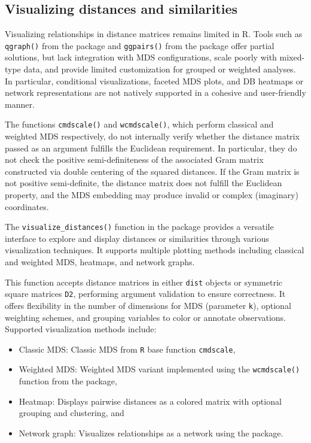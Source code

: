 \subsection{Visualizing distances and similarities}

Visualizing relationships in distance matrices remains limited in R. Tools such as \texttt{qgraph()} from the  package \citep{qgraph} and \texttt{ggpairs()} from the  package \citep{GGally} offer partial solutions, but lack integration with MDS configurations, scale poorly with mixed-type data, and provide limited customization for grouped or weighted analyses. In particular, conditional visualizations, faceted MDS plots, and DB heatmaps or network representations are not natively supported in a cohesive and user-friendly manner.

The functions \texttt{cmdscale()} and \texttt{wcmdscale()}, which perform classical and weighted MDS respectively, do not internally verify whether the distance matrix passed as an argument fulfills the Euclidean requirement. In particular, they do not check the positive semi-definiteness of the associated Gram matrix constructed via double centering of the squared distances. If the Gram matrix is not positive semi-definite, the distance matrix does not fulfill the Euclidean property, and the MDS embedding may produce invalid or complex (imaginary) coordinates.

The \texttt{visualize\_distances()} function in the  package provides a versatile interface to explore and display distances or similarities through various visualization techniques. It supports multiple plotting methods including classical and weighted MDS, heatmaps, and network graphs.

This function accepts distance matrices in either \texttt{dist} objects or symmetric square matrices \texttt{D2}, performing argument validation to ensure correctness. It offers flexibility in the number of dimensions for MDS (parameter \texttt{k}), optional weighting schemes, and grouping variables to color or annotate observations. Supported visualization methods include:
\begin{itemize}
    \item Classic MDS: Classic MDS from \texttt{R} base function \texttt{cmdscale},
    \item Weighted MDS: Weighted MDS variant implemented using the \texttt{wcmdscale()} function from the  package,
    \item Heatmap: Displays pairwise distances as a colored matrix with optional grouping and clustering, and
    \item Network graph: Visualizes relationships as a network using the  package.
\end{itemize}


